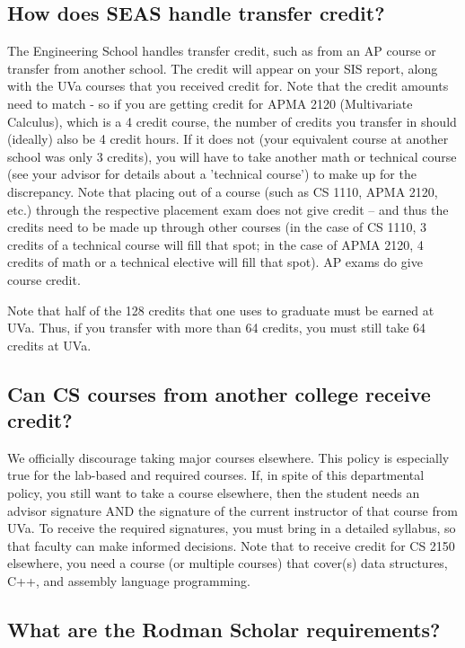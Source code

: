 \subsection{How does SEAS handle transfer credit?}

The Engineering School handles transfer credit, such as from an AP
course or transfer from another school. The credit will appear on your
SIS report, along with the UVa courses that you received credit
for. Note that the credit amounts need to match - so if you are
getting credit for APMA 2120 (Multivariate Calculus), which is a
4 credit course, the number of credits you transfer in should
(ideally) also be 4 credit hours. If it does not (your equivalent
course at another school was only 3 credits), you will have to take
another math or technical course (see your advisor for details about a
'technical course') to make up for the discrepancy. Note that placing
out of a course (such as CS 1110, APMA 2120, etc.) through
the respective placement exam does not give credit – and thus the
credits need to be made up through other courses (in the case of CS
1110, 3 credits of a technical course will fill that spot; in
the case of APMA 2120, 4 credits of math or a technical elective
will fill that spot). AP exams do give course credit.

Note that half of the 128 credits that one uses to graduate must be
earned at UVa. Thus, if you transfer with more than 64 credits, you
must still take 64 credits at UVa.

\subsection{Can CS courses from another college receive credit?}

We officially discourage taking major courses elsewhere. This policy
is especially true for the lab-based and required courses. If, in
spite of this departmental policy, you still want to take a course
elsewhere, then the student needs an advisor signature AND the
signature of the current instructor of that course from UVa. To
receive the required signatures, you must bring in a detailed
syllabus, so that faculty can make informed decisions. Note that to
receive credit for CS 2150 elsewhere, you need a course (or
multiple courses) that cover(s) data structures, C++, and assembly
language programming.

\subsection{What are the Rodman Scholar requirements?}

